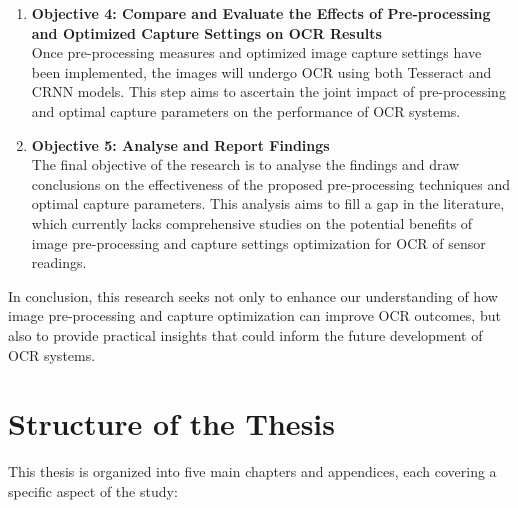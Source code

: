 \begin{enumerate}
      \item \textbf{Objective 4: Compare and Evaluate the Effects of Pre-processing and Optimized Capture Settings on OCR Results}\\
            Once pre-processing measures and optimized image capture settings have been implemented, the images will undergo OCR using both Tesseract and CRNN models. This step aims to ascertain the joint impact of pre-processing and optimal capture parameters on the performance of OCR systems.

      \item \textbf{Objective 5: Analyse and Report Findings}\\
            The final objective of the research is to analyse the findings and draw conclusions on the effectiveness of the proposed pre-processing techniques and optimal capture parameters. This analysis aims to fill a gap in the literature, which currently lacks comprehensive studies on the potential benefits of image pre-processing and capture settings optimization for OCR of sensor readings.
\end{enumerate}

In conclusion, this research seeks not only to enhance our understanding of how image pre-processing and capture optimization can improve OCR outcomes, but also to provide practical insights that could inform the future development of OCR systems.

\newpage

\section{Structure of the Thesis}

This thesis is organized into five main chapters and appendices, each covering a specific aspect of the study:

